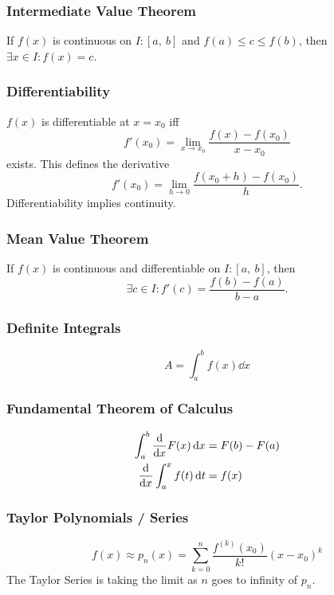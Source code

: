 \documentclass{article}
\begin{document}
\begin{multicols}{3}
    \subsubsection*{Intermediate Value Theorem}
    If $f(x)$ is continuous on $I:\left[ a, \: b \right]$ and $f(a) \leq c \leq f(b)$, then $\exists x\in I:f(x)=c$.
    \subsubsection*{Differentiability}
    $f(x)$ is differentiable at $x=x_0$ iff
    \begin{equation*}
        f'(x_0) = \lim_{x\to x_0} \frac{f(x)-f(x_0)}{x-x_0}
    \end{equation*}
    exists. This defines the derivative
    \begin{equation*}
        f'(x_0) = \lim_{h\to 0} \frac{f(x_0+h)-f(x_0)}{h}.
    \end{equation*}
    Differentiability implies continuity.
    \subsubsection*{Mean Value Theorem}
    If $f(x)$ is continuous and differentiable on $I:\left[ a,\:b \right]$, then
    \begin{equation*}
        \exists c\in I:f'(c)=\frac{f(b)-f(a)}{b-a}.
    \end{equation*}
    \subsubsection*{Definite Integrals}
    \begin{equation*}
        A = \int_a^b f(x) \dd{x}
    \end{equation*}
    \subsubsection*{Fundamental Theorem of Calculus}
    \begin{align*}
        \int_a^b \dv{x}F(x) \dd{x} & = F(b) - F(a) \\
        \dv{x}\int_a^x f(t) \dd{t} & = f(x)
    \end{align*}
    \subsubsection*{Taylor Polynomials / Series}
    \begin{equation*}
        f(x) \approx p_n(x) = \sum_{k=0}^n \frac{f^{\left( k \right)}(x_0)}{k!} \left( x-x_0 \right)^k
    \end{equation*}
    The Taylor Series is taking the limit as $n$ goes to infinity of $p_n$.


\end{multicols}
\end{document}
